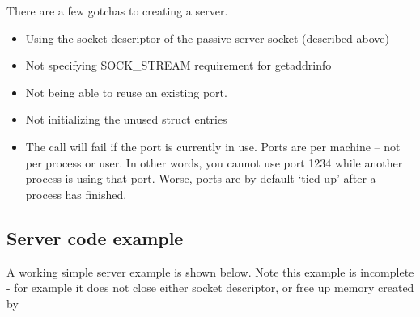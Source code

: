 There are a few gotchas to creating a server.

\begin{itemize}
\item
  Using the socket descriptor of the passive server socket (described above)
\item
  Not specifying SOCK\_STREAM requirement for getaddrinfo
\item
  Not being able to reuse an existing port.
\item
  Not initializing the unused struct entries
\item
  The  call will fail if the port is currently in use. Ports are per machine -- not per process or user.
  In other words, you cannot use port 1234 while another process is using that port.
  Worse, ports are by default `tied up' after a process has finished.
\end{itemize}

\subsection{Server code example}

A working simple server example is shown below.
Note this example is incomplete - for example it does not close either socket descriptor, or free up memory created by 

